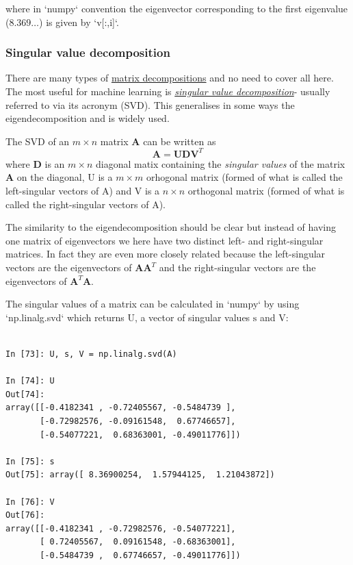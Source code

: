 \documentclass[a4paper,10pt]{article}
\begin{document}
where in `numpy` convention the eigenvector corresponding to the first eigenvalue ($8.369\ldots$) is given by `v[:,i]`.


\subsubsection{ Singular value decomposition}


There are many types of \href{https://en.wikipedia.org/wiki/Matrix_decomposition}{matrix decompositions} and no need to cover all here. The most useful for machine learning is \href{https://en.wikipedia.org/wiki/Singular_value_decomposition}{\textit{singular value decomposition}}- usually referred to via its acronym (SVD). This generalises in some ways the eigendecomposition and is widely used.

The SVD of an $m \times n$ matrix $\mathbf{A}$ can be written as $$\mathbf{A} = \mathbf{U}\mathbf{D}\mathbf{V}^T$$ where $\mathbf{D}$ is an $m\times n$ diagonal matix containing the \textit{singular values} of the matrix $\mathbf{A}$ on the diagonal, $\mathrm{U}$ is a $m\times m$ orhogonal matrix (formed of what is called the left-singular vectors of $\mathrm{A}$)  and $\mathrm{V}$ is a $n\times n$ orthogonal matrix (formed of what is called the right-singular vectors of $\mathrm{A}$).

The similarity to the eigendecomposition should be clear but instead of having one matrix of eigenvectors we here have two distinct left- and right-singular matrices. In fact they are even more closely related because the left-singular vectors are the eigenvectors of $\mathbf{A}\mathbf{A}^T$ and the right-singular vectors are the eigenvectors of $\mathbf{A}^T\mathbf{A}$.

The singular values of a matrix can be calculated in `numpy` by using `np.linalg.svd` which returns $\mathrm{U}$, a vector of singular values $\mathrm{s}$ and $\mathrm{V}$:

\begin{lstlisting}

In [73]: U, s, V = np.linalg.svd(A)

In [74]: U
Out[74]: 
array([[-0.4182341 , -0.72405567, -0.5484739 ],
       [-0.72982576, -0.09161548,  0.67746657],
       [-0.54077221,  0.68363001, -0.49011776]])

In [75]: s
Out[75]: array([ 8.36900254,  1.57944125,  1.21043872])

In [76]: V
Out[76]: 
array([[-0.4182341 , -0.72982576, -0.54077221],
       [ 0.72405567,  0.09161548, -0.68363001],
       [-0.5484739 ,  0.67746657, -0.49011776]])
\end{lstlisting}
\end{document}
